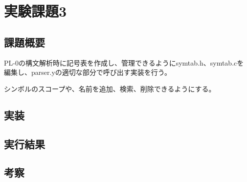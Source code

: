 \section{実験課題3}
\subsection{課題概要}
PL-0の構文解析時に記号表を作成し、管理できるようにsymtab.h、symtab.cを編集し、parser.yの適切な部分で呼び出す実装を行う。

シンボルのスコープや、名前を追加、検索、削除できるようにする。

\subsection{実装}




\subsection{実行結果}

\subsection{考察}
